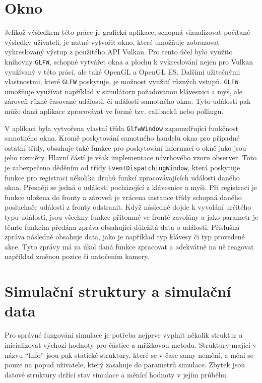 \section{Okno}
\label{chapter:okno}
Jelikož výsledkem této práce je grafická aplikace, schopná vizualizovat počítané výsledky uživateli, je nutné vytvořit okno, které umožňuje zobrazovat vykreslovaný výstup z použitého API Vulkan. Pro tento účel bylo využito knihovny \texttt{GLFW}, schopné vytvářet okna a plochu k vykreslování nejen pro Vulkan využívaný v této práci, ale také OpenGL a OpenGL ES. Dalšími užitečnými vlastnostmi, které \texttt{GLFW} poskytuje, je možnost využití různých vstupů. \texttt{GLFW} umožňuje využívat například v simulátoru požadovanou klávesnici a myš, ale zároveň různé časované události, či události samotného okna. Tyto události pak může daná aplikace zpracovávat ve formě tzv. callbacků nebo pollingu. 

V aplikaci byla vytvořena vlastní třída \texttt{GlfwWindow} zapouzdřující funkčnost samotného okna. Kromě poskytování samotného handelu okna pro případné ostatní třídy, obsahuje také funkce pro poskytování informací o okně jako jsou jeho rozměry. Hlavní částí je však implementace návrhového vzoru observer. Toto je zabezpečeno děděním od třídy \texttt{EventDispatchingWindow}, která poskytuje funkce pro registraci několika druhů funkcí zpracovávajících události daného okna. Přesněji se jedná o události pocházející z klávesnice a myši. Při registraci je funkce uložena do fronty a zároveň je vrácena instance třídy schopná daného posluchače událostí z fronty odstranit. Když následně dojde k vyvolání určitého typu událostí, jsou všechny funkce přítomné ve frontě zavolány a jako parametr je těmto funkcím předána zpráva obsahující důležitá data o události. Příslušná zpráva následně obsahuje data, jako je například typ klávesy či typ provedené akce. Tyto zprávy má za úkol daná funkce zpracovat a adekvátně na ně reagovat například změnou pozice či natočením kamery.


\section{Simulační struktury a simulační data}
\label{chapter:simStructData}
Pro správné fungování simulace je potřeba nejprve vyplnit několik struktur a inicializovat výchozí hodnoty pro částice a mřížkovou metodu. Struktury mající v názvu \enquote{Info} jsou pak statické struktury, které se v čase samy nemění, a mění se pouze na popud uživatele, který zasahuje do parametrů simulace. Zbytek jsou datové struktury držící stav simulace a měnící hodnoty v jejím průběhu.

